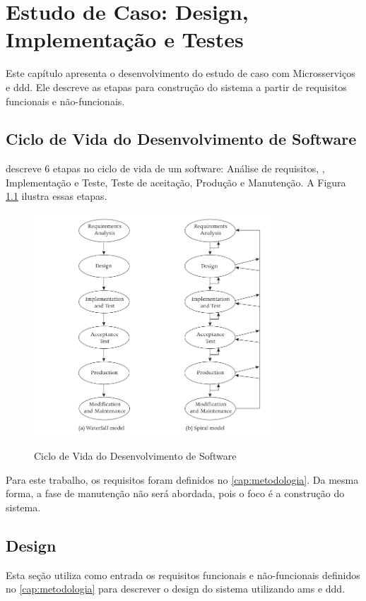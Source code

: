 \chapter{Estudo de Caso: Design, Implementação e Testes}
\label{cap:desenvolvimento}

Este capítulo apresenta o desenvolvimento do estudo de caso com Microsserviços e \acrshort{ddd}. Ele descreve as etapas para construção do sistema a partir de requisitos funcionais e não-funcionais.

\section{Ciclo de Vida do Desenvolvimento de Software}
 descreve 6 etapas no ciclo de vida de um software: Análise de requisitos, , Implementação e Teste, Teste de aceitação, Produção e Manutenção. A Figura \ref{fig:ciclo-vida} ilustra essas etapas. 

\begin{figure}[H]
    \centering
    \caption{Ciclo de Vida do Desenvolvimento de Software}
    \includegraphics[width=0.8\textwidth]{media/software-life-cycle.png}
    \label{fig:ciclo-vida}
\end{figure}

Para este trabalho, os requisitos foram definidos no \autoref{cap:metodologia}. Da mesma forma, a fase de manutenção não será abordada, pois o foco é a construção do sistema.

\section{Design}
Esta seção utiliza como entrada os requisitos funcionais e não-funcionais definidos no \autoref{cap:metodologia} para descrever o design do sistema utilizando \acrfull{ams} e \acrfull{ddd}.

